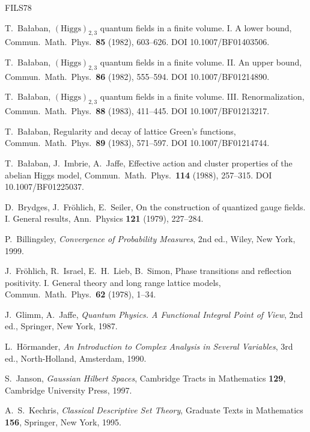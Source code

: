 \begin{thebibliography}{FILS78}

 T.~Ba{\l}aban, $(\mathrm{Higgs})_{2,3}$ quantum fields in a finite volume. I. A lower bound, Commun.\ Math.\ Phys.\ \textbf{85} (1982), 603--626. DOI 10.1007/BF01403506.

 T.~Ba{\l}aban, $(\mathrm{Higgs})_{2,3}$ quantum fields in a finite volume. II. An upper bound, Commun.\ Math.\ Phys.\ \textbf{86} (1982), 555--594. DOI 10.1007/BF01214890.

 T.~Ba{\l}aban, $(\mathrm{Higgs})_{2,3}$ quantum fields in a finite volume. III. Renormalization, Commun.\ Math.\ Phys.\ \textbf{88} (1983), 411--445. DOI 10.1007/BF01213217.

 T.~Ba{\l}aban, Regularity and decay of lattice Green's functions, Commun.\ Math.\ Phys.\ \textbf{89} (1983), 571--597. DOI 10.1007/BF01214744.

 T.~Ba{\l}aban, J.~Imbrie, A.~Jaffe, Effective action and cluster properties of the abelian Higgs model, Commun.\ Math.\ Phys.\ \textbf{114} (1988), 257--315. DOI 10.1007/BF01225037.

 D.~Brydges, J.~Fr\"ohlich, E.~Seiler, On the construction of quantized gauge fields. I. General results, Ann.\ Physics \textbf{121} (1979), 227--284.

 P.~Billingsley, \emph{Convergence of Probability Measures}, 2nd ed., Wiley, New York, 1999.

 J.~Fr\"ohlich, R.~Israel, E.~H.~Lieb, B.~Simon, Phase transitions and reflection positivity. I. General theory and long range lattice models, Commun.\ Math.\ Phys.\ \textbf{62} (1978), 1--34.

 J.~Glimm, A.~Jaffe, \emph{Quantum Physics. A Functional Integral Point of View}, 2nd ed., Springer, New York, 1987.

 L.~H\"ormander, \emph{An Introduction to Complex Analysis in Several Variables}, 3rd ed., North-Holland, Amsterdam, 1990.

 S.~Janson, \emph{Gaussian Hilbert Spaces}, Cambridge Tracts in Mathematics \textbf{129}, Cambridge University Press, 1997.

 A.~S.~Kechris, \emph{Classical Descriptive Set Theory}, Graduate Texts in Mathematics \textbf{156}, Springer, New York, 1995.


\end{thebibliography}
